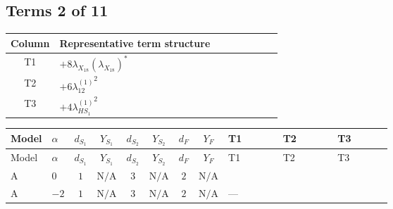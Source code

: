 \documentclass[8pt]{article}
\begin{document}
\begin{landscape}
\subsection*{Terms 2 of 11}
\begin{center}
\begin{tabular}{@{}c >{\raggedright\arraybackslash}p{0.82\linewidth}@{}}
\toprule
Column & Representative term structure \\
\midrule
T1 & \(\displaystyle +8 {\lambda_{X_{18}}} \left({\lambda_{X_{18}}}\right)^{*}\) \\
\midrule
T2 & \(\displaystyle +6 {\lambda_{12}^{(1)}}^2\) \\
\midrule
T3 & \(\displaystyle +4 {\lambda_{HS_1}^{(1)}}^2\) \\
\midrule
\bottomrule
\end{tabular}
\end{center}
\smallskip
\tiny
\begin{longtable}{@{}llcccccc >{\raggedright\arraybackslash}p{0.21\linewidth} >{\raggedright\arraybackslash}p{0.21\linewidth} >{\raggedright\arraybackslash}p{0.21\linewidth}@{}}
\toprule
Model & $\alpha$ & $d_{S_1}$ & $Y_{S_1}$ & $d_{S_2}$ & $Y_{S_2}$ & $d_F$ & $Y_F$ & T1 & T2 & T3 \\
\midrule
\endfirsthead
\toprule
Model & $\alpha$ & $d_{S_1}$ & $Y_{S_1}$ & $d_{S_2}$ & $Y_{S_2}$ & $d_F$ & $Y_F$ & T1 & T2 & T3 \\
\midrule
\endhead
A & $0$ & $1$ & $\text{N/A}$ & $3$ & $\text{N/A}$ & $2$ & $\text{N/A}$ & \scriptsize\adjustbox{max width=\linewidth}{$\begin{gathered} +8 {\lambda_{X_{18}}} \left({\lambda_{X_{18}}}\right)^{*}\end{gathered}$} & \scriptsize\adjustbox{max width=\linewidth}{$\begin{gathered} +6 {\lambda_{12}^{(1)}}^2\end{gathered}$} & \scriptsize\adjustbox{max width=\linewidth}{$\begin{gathered} +4 {\lambda_{HS_1}^{(1)}}^2\end{gathered}$} \\
\midrule
A & $-2$ & $1$ & $\text{N/A}$ & $3$ & $\text{N/A}$ & $2$ & $\text{N/A}$ & --- & \scriptsize\adjustbox{max width=\linewidth}{$\begin{gathered} +6 {\lambda_{12}^{(1)}}^2\end{gathered}$} & \scriptsize\adjustbox{max width=\linewidth}{$\begin{gathered} +4 {\lambda_{HS_1}^{(1)}}^2\end{gathered}$} \\

\end{longtable}
\end{landscape}
\end{document}

